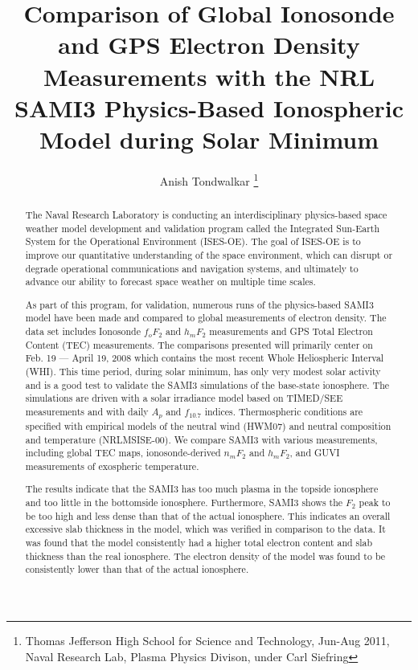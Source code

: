 \documentclass[12pt]{article}
\title
{Comparison of Global Ionosonde and GPS Electron Density Measurements with the NRL SAMI3 Physics-Based Ionospheric Model during Solar Minimum}
\author{Anish Tondwalkar
\footnote{Thomas Jefferson High School for Science and Technology,
Jun-Aug 2011, Naval Research Lab, Plasma Physics Divison, under Carl Siefring}
}%
\begin{document}
\maketitle
\begin{abstract}
  The Naval Research Laboratory is conducting an interdisciplinary physics-based space weather model development and validation program called the Integrated Sun-Earth System for the Operational Environment (ISES-OE). The goal of ISES-OE is to improve our quantitative understanding of the space environment, which can disrupt or degrade operational communications and navigation systems, and ultimately to advance our ability to forecast space weather on multiple time scales.
  
  As part of this program, for validation, numerous runs of the physics-based SAMI3 model have been made and compared to global measurements of electron density.  The data set includes  Ionosonde $f_oF_2$ and $h_mF_2$ measurements and GPS Total Electron Content (TEC) measurements. The comparisons presented will primarily center on Feb. 19 --- April 19, 2008 which contains the most recent Whole Heliospheric Interval (WHI).  This time period, during solar minimum, has only very modest solar activity and is a good test to validate the SAMI3 simulations of the base-state ionosphere. The simulations are driven with a solar irradiance model based on TIMED/SEE measurements and with daily $A_p$ and $f_{10.7}$ indices. Thermospheric conditions are specified with empirical models of the neutral wind (HWM07) and neutral composition and temperature (NRLMSISE-00). We compare SAMI3 with various measurements, including global TEC maps, ionosonde-derived $n_mF_2$ and $h_mF_2$, and GUVI measurements of exospheric temperature.
  
  The results indicate that the SAMI3 has too much plasma in the topside ionosphere and too little in the bottomside ionosphere. Furthermore, SAMI3 shows the $F_2$ peak to be too high and less dense than that of the actual ionosphere. This indicates an overall excessive slab thickness in the model, which was verified in comparison to the data.  It was found that the model consistently had a higher total electron content and slab thickness than the real ionosphere. The electron density of the model was found to be consistently lower than that of the 
actual ionosphere.
\end{abstract}
\end{document}
